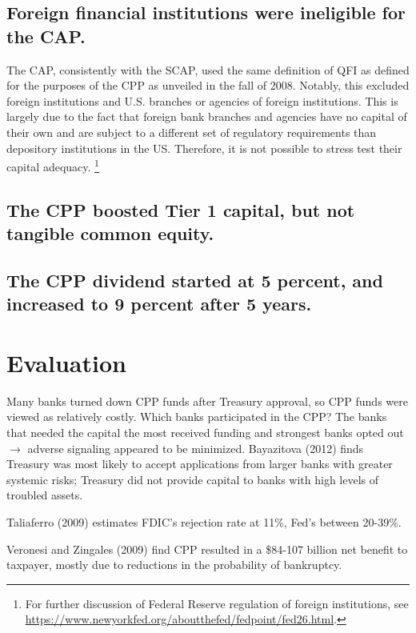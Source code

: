 \documentclass[12pt]{article}
\begin{document}
\subsection{Foreign financial institutions were ineligible for the CAP.}

The CAP, consistently with the SCAP, used the same definition of QFI as defined for the purposes of the CPP as unveiled in the fall of 2008. Notably, this excluded foreign institutions and U.S. branches or agencies of foreign institutions. This is largely due to the fact that foreign bank branches and agencies have no capital of their own and are subject to a different set of regulatory requirements than depository institutions in the US. Therefore, it is not possible to stress test their capital adequacy. \footnote{For further discussion of Federal Reserve regulation of foreign institutions, see \url{https://www.newyorkfed.org/aboutthefed/fedpoint/fed26.html}.}

\subsection{The CPP boosted Tier 1 capital, but not tangible common equity.}

\subsection{The CPP dividend started at 5 percent, and increased to 9 percent after 5 years.}

\section{Evaluation}

Many banks turned down CPP funds after Treasury approval, so CPP funds were viewed as relatively costly.  Which banks participated in the CPP? The banks that needed the capital the most received funding and strongest banks opted out $\rightarrow$ adverse signaling appeared to be minimized. Bayazitova (2012) finds Treasury was most likely to accept applications from larger banks with greater systemic risks; Treasury did not provide capital to banks with high levels of troubled assets. 

Taliaferro (2009) estimates FDIC's rejection rate at 11\%, Fed's between 20-39\%.

Veronesi and Zingales (2009) find CPP resulted in a \$84-107 billion net benefit to taxpayer, mostly due to reductions in the probability of bankruptcy. 
\end{document}
